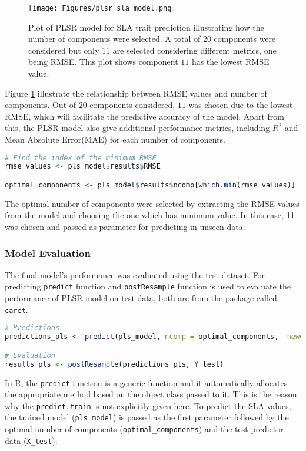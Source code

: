 \documentclass[12pt,a4paper]{report}
\begin{document}
\begin{figure}[h]
    \centering
    \texttt{[image: Figures/plsr\_sla\_model.png]}
    \caption{Plot of PLSR model for SLA trait prediction illustrating how the number of components were selected. A total of $20$ components were considered but only $11$ are selected considering different metrics, one being RMSE. This plot shows component $11$ has the lowest RMSE value.}
    \label{fig:plsr_sla_model}
\end{figure}

Figure \ref{fig:plsr_sla_model} illustrate the relationship between RMSE values and number of components. Out of $20$ components considered, $11$ was chosen due to the lowest RMSE, which will facilitate the predictive accuracy of the model. Apart from this, the PLSR model also give additional performance metrics, including $R^2$ and Mean Absolute Error(MAE) for each number of components. \\

\begin{lstlisting}[language=R, style=mystyle]
# Find the index of the minimum RMSE
rmse_values <- pls_model$results$RMSE

optimal_components <- pls_model$results$ncomp[which.min(rmse_values)]
\end{lstlisting}
The optimal number of components were selected by extracting the RMSE values from the model and choosing the one which has minimum value. In this case, 11 was chosen and passed as parameter for predicting in unseen data.

\subsubsection*{Model Evaluation}
The final model's performance was evaluated using the test dataset. For predicting \texttt{predict} function and \texttt{postResample} function is used to evaluate the performance of PLSR model on test data, both are from the package called \texttt{caret}. \\

\begin{lstlisting}[language=R, style=mystyle]
# Predictions
predictions_pls <- predict(pls_model, ncomp = optimal_components,  newdata = X_test)

# Evaluation
results_pls <- postResample(predictions_pls, Y_test)
\end{lstlisting}

In R, the \texttt{predict} function is a generic function and it automatically allocates the appropriate method based on the object class passed to it. This is the reason why the \texttt{predict.train} is not explicitly given here. To predict the SLA values, the trained model (\texttt{pls\_model}) is passed as the first parameter followed by  the optimal number of components (\texttt{optimal\_components}) and the test predictor data (\texttt{X\_test}). \\
\end{document}
